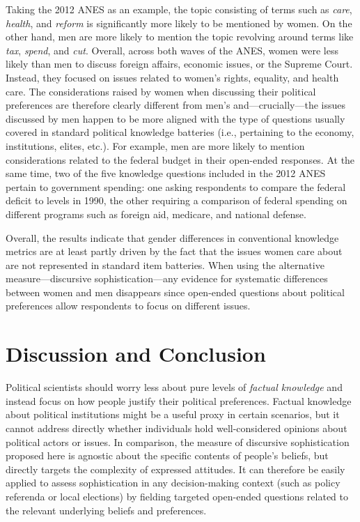 Taking the 2012 ANES as an example, the topic consisting of terms such as \textit{care}, \textit{health}, and \textit{reform} is significantly more likely to be mentioned by women. On the other hand, men are more likely to mention the topic revolving around terms like \textit{tax}, \textit{spend}, and \textit{cut}. Overall, across both waves of the ANES, women were less likely than men to discuss foreign affairs, economic issues, or the Supreme Court. Instead, they focused on issues related to women's rights, equality, and health care. The considerations raised by women when discussing their political preferences are therefore clearly different from men's and---crucially---the issues discussed by men happen to be more aligned with the type of questions usually covered in standard political knowledge batteries (i.e., pertaining to the economy, institutions, elites, etc.). For example, men are more likely to mention considerations related to the federal budget in their open-ended responses. At the same time, two of the five knowledge questions included in the 2012 ANES pertain to government spending: one asking respondents to compare the federal deficit to levels in 1990, the other requiring a comparison of federal spending on different programs such as foreign aid, medicare, and national defense.

Overall, the results indicate that gender differences in conventional knowledge metrics are at least partly driven by the fact that the issues women care about are not represented in standard item batteries. When using the alternative measure---discursive sophistication---any evidence for systematic differences between women and men disappears since open-ended questions about political preferences allow respondents to focus on different issues. 



\section*{Discussion and Conclusion}

Political scientists should worry less about pure levels of \textit{factual knowledge} and instead focus on how people justify their political preferences. Factual knowledge about political institutions might be a useful proxy in certain scenarios, but it cannot address directly whether individuals hold well-considered opinions about political actors or issues. In comparison, the measure of discursive sophistication proposed here is agnostic about the specific contents of people's beliefs, but directly targets the complexity of expressed attitudes. It can therefore be easily applied to assess sophistication in any decision-making context (such as policy referenda or local elections) by fielding targeted open-ended questions related to the relevant underlying beliefs and preferences.

